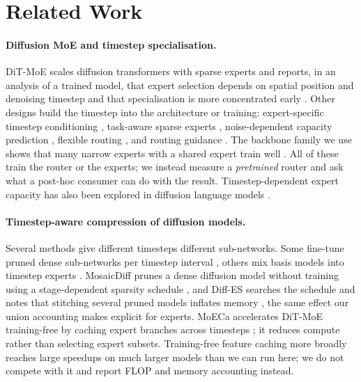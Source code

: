 \section{Related Work}\label{sec:related}

\paragraph{Diffusion MoE and timestep specialisation.}
DiT-MoE scales diffusion transformers with sparse experts and reports, in an analysis of a trained model, that expert selection depends on spatial position and denoising timestep and that specialisation is more concentrated early \citep{fei2024ditmoe}.
Other designs build the timestep into the architecture or training: expert-specific timestep conditioning \citep{cheng2025diffmoe}, task-aware sparse experts \citep{park2024switchdit}, noise-dependent capacity prediction \citep{shi2025diffmoe}, flexible routing \citep{yuan2025racedit}, and routing guidance \citep{wei2025promoe}.
The backbone family we use shows that many narrow experts with a shared expert train well \citep{liu2025dsmoe,dai2024deepseekmoe}.
All of these train the router or the experts; we instead measure a \emph{pretrained} router and ask what a post-hoc consumer can do with the result.
Timestep-dependent expert capacity has also been explored in diffusion language models \citep{zhang2026ecdlm,wei2026team}.

\paragraph{Timestep-aware compression of diffusion models.}
Several methods give different timesteps different sub-networks. Some fine-tune pruned dense sub-networks per timestep interval \citep{ganjdanesh2024diffpruning,yang2025alter}, others mix basis models into timestep experts \citep{fang2024remixdit}.
MosaicDiff prunes a dense diffusion model without training using a stage-dependent sparsity schedule \citep{guo2025mosaicdiff}, and Diff-ES searches the schedule and notes that stitching several pruned models inflates memory \citep{liu2026diffes}, the same effect our union accounting makes explicit for experts.
MoECa accelerates DiT-MoE training-free by caching expert branches across timesteps \citep{li2026moeca}; it reduces compute rather than selecting expert subsets.
Training-free feature caching more broadly \citep{liu2025taylorseer} reaches large speedups on much larger models than we can run here; we do not compete with it and report FLOP and memory accounting instead.

